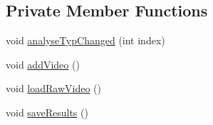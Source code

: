 \subsection*{Private Member Functions}
\begin{DoxyCompactItemize}
\item 
void \hyperlink{classGUI_1_1AnalysisTab_ae89926cdddcb35828531b826e6caac13}{analyse\+Typ\+Changed} (int index)
\item 
void \hyperlink{classGUI_1_1AnalysisTab_aa7983a33bb5717a628f2dd72a6f36405}{add\+Video} ()
\item 
void \hyperlink{classGUI_1_1AnalysisTab_afb18c20ecdc5393c31167dd5003eee21}{load\+Raw\+Video} ()
\item 
void \hyperlink{classGUI_1_1AnalysisTab_a5c087450ee93776fd121b0fd6af473e6}{save\+Results} ()
\end{DoxyCompactItemize}
